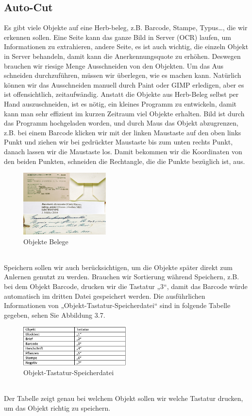 \documentclass[10pt,a4paper]{report}
\begin{document}
\subsection{Auto-Cut}
Es gibt viele Objekte auf eine Herb-beleg, z.B. Barcode, Stampe, Typus…, die wir erkennen sollen. Eine Seite kann das ganze Bild in Server (OCR) laufen, um Informationen zu extrahieren, andere Seite, es ist auch wichtig, die einzeln Objekt in Server behandeln, damit kann die Anerkennungsquote zu erhöhen. Deswegen brauchen wir riesige Menge Ausschneiden von den Objekten.
Um das Aus schneiden durchzuführen, müssen wir überlegen, wie es machen kann. Natürlich können wir das Ausschneiden manuell durch Paint oder GIMP erledigen, aber es ist offensichtlich, zeitaufwändig. Anstatt die Objekte aus Herb-Beleg selbst per Hand auszuschneiden, ist es nötig, ein kleines Programm zu entwickeln, damit kann man sehr effizient im kurzen Zeitraum viel Objekte erhalten. 
Bild ist durch das Programm hochgeladen worden, und durch Maus das Objekt abzugrenzen, z.B. bei einem Barcode klicken wir mit der linken Maustaste auf den oben links Punkt und ziehen wir bei gedrückter Maustaste bis zum unten rechts Punkt, danach lassen wir die Maustaste los. Damit bekommen wir die Koordinaten von den beiden Punkten, schneiden die Rechtangle, die die Punkte bezüglich ist, aus.\\
\begin{figure}[htbp] 
	\centering
	\includegraphics[width=0.4\textwidth]{Cutobjekte.png}
	\caption{Objekte Belege}
	\label{fig:Bild 3.6}
\end{figure}\\
Speichern sollen wir auch berücksichtigen, um die Objekte später direkt zum Anlernen genutzt zu werden. Brauchen wir Sortierung während Speichern, z.B. bei dem Objekt Barcode, drucken wir die Tastatur „3“, damit das Barcode würde automatisch im dritten Datei gespeichert werden. Die ausführlichen Informationen von „Objekt-Tastatur-Speicherdatei“  sind in folgende Tabelle gegeben, sehen Sie Abbildung 3.7.\\
\begin{figure}[htbp] 
	\centering
	\includegraphics[width=0.5\textwidth]{Tabelle.png}
	\caption{Objekt-Tastatur-Speicherdatei}
	\label{fig:Bild 3.7}
\end{figure}\\
Der Tabelle zeigt genau bei welchem Objekt sollen wir welche Tastatur drucken, um das Objekt richtig zu speichern.
\end{document}
